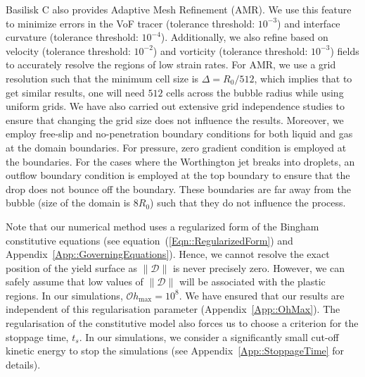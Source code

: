 \documentclass[final]{jfm}
\begin{document}
Basilisk C also provides Adaptive Mesh Refinement (AMR). We use this feature to minimize errors in the VoF tracer (tolerance threshold: $10^{-3}$) and interface curvature (tolerance threshold: $10^{-4}$). Additionally, we also refine based on velocity (tolerance threshold: $10^{-2}$) and vorticity (tolerance threshold: $10^{-3}$) fields to accurately resolve the regions of low strain rates. For AMR, we use a grid resolution such that the minimum cell size is $\Delta = R_0/512$, which implies that to get similar results, one will need $512$ cells across the bubble radius while using uniform grids. We have also carried out extensive grid independence studies to ensure that changing the grid size does not influence the results. Moreover, we employ free-slip and no-penetration boundary conditions for both liquid and gas at the domain boundaries.  For pressure, zero gradient condition is employed at the boundaries. For the cases where the Worthington jet breaks into droplets, an outflow boundary condition is employed at the top boundary to ensure that the drop does not bounce off the boundary. These boundaries are far away from the bubble (size of the domain is $8R_0$)  such that they do not influence the process. 

Note that our numerical method uses a regularized form of the Bingham constitutive equations (see equation~(\ref{Eqn::RegularizedForm}) and Appendix~\ref{App::GoverningEquations}). Hence, we cannot resolve the exact position of the yield surface as $\|\boldsymbol{\mathcal{D}}\|$ is never precisely zero. However, we can safely assume that low values of $\|\boldsymbol{\mathcal{D}}\|$ will be associated with the plastic regions. In our simulations, $\mathcal{O}h_{\text{max}}=10^8$. We have ensured that our results are independent of this regularisation parameter (Appendix~\ref{App::OhMax}). The regularisation of the constitutive model also forces us to choose a criterion for the stoppage time, $t_s$. In our simulations, we consider a significantly small cut-off kinetic energy to stop the simulations (see Appendix~\ref{App::StoppageTime} for details). 
\end{document}
